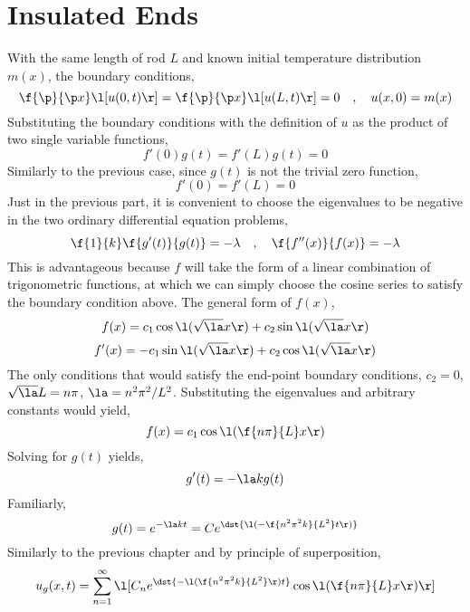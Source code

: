 \section{Insulated Ends}
\begin{comment} 
\end{comment}
With the same length of rod $L$ and known initial temperature distribution $m(x)$, the boundary conditions,
$$\f{\p}{\p x}\l[u(0,t)\r] = \f{\p}{\p x}\l[u(L,t)\r] = 0\quad,\quad u(x,0) = m(x)$$
Substituting the boundary conditions with the definition of $u$ as the product of two single variable functions,
$$f'(0)g(t) = f'(L)g(t) = 0$$
Similarly to the previous case, since $g(t)$ is not the trivial zero function,
$$f'(0) = f'(L) = 0$$
Just in the previous part, it is convenient to choose the eigenvalues to be negative in the two ordinary differential equation problems,
$$\f{1}{k}\f{g'(t)}{g(t)} = -\lambda \quad,\quad \f{f''(x)}{f(x)} = -\lambda$$
This is advantageous because $f$ will take the form of a linear combination of trigonometric functions, at which we can simply choose the cosine series to satisfy the boundary condition above. The general form of $f(x)$,
$$f(x) = c_1\cos\l(\sqrt{\la}x\r) + c_2\sin\l(\sqrt{\la}x\r)$$
$$f'(x) = -c_1\sin\l(\sqrt{\la}x\r) + c_2\cos\l(\sqrt{\la}x\r)$$
The only conditions that would satisfy the end-point boundary conditions, $c_2 = 0$, $\sqrt{\la}L = n\pi$, $\la = n^2\pi^2/L^2$. Substituting the eigenvalues and arbitrary constants would yield,
$$f(x) = c_1\cos\l(\f{n\pi}{L}x\r)$$
Solving for $g(t)$ yields,
$$g'(t) = -\la k g(t)$$
Familiarly,
$$g(t) =  e^{-\la k t} = Ce^{\dst{\l(-\f{n^2\pi^2k}{L^2} t\r)}}$$
Similarly to the previous chapter and by principle of superposition,
$$u_g(x,t) = \sum^{\infty}_{n=1}\l[C_ne^{\dst{-\l(\f{n^2\pi^2k}{L^2}\r)t}}\cos\l(\f{n\pi}{L} x\r)\r]$$
